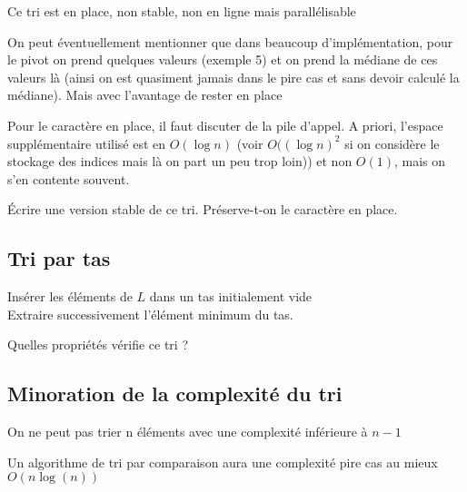 \begin{proposition}
	Ce tri est en place, non stable, non en ligne mais parallélisable
\end{proposition}

\begin{com}
	On peut éventuellement mentionner que dans beaucoup d'implémentation, pour le pivot on prend quelques valeurs (exemple 5) et on prend la médiane de ces valeurs là (ainsi on est quasiment jamais dans le pire cas et sans devoir calculé la médiane). Mais avec l'avantage de rester en place
\end{com}

\begin{com}
	Pour le caractère en place, il faut discuter de la pile d'appel. A priori, l'espace supplémentaire utilisé est en $O(\log n)$ (voir $O((\log n)^2$ si on considère le stockage des indices mais là on part un peu trop loin)) et non $O(1)$, mais on s'en contente souvent.
\end{com}

\begin{exercise}
	Écrire une version stable de ce tri. Préserve-t-on le caractère en place.
\end{exercise}

\subsection{Tri par tas}

\begin{algorithm}[H]
	\caption{$tri\_tas(L)$}
	Insérer les éléments de $L$ dans un tas initialement vide\\
	Extraire successivement l'élément minimum du tas.
\end{algorithm}

\begin{exercise}
	Quelles propriétés vérifie ce tri ?
\end{exercise}

\subsection{Minoration de la complexité du tri}

\begin{proposition}
	On ne peut pas trier n éléments avec une complexité inférieure à $n-1$
\end{proposition}

\begin{proposition}
	Un algorithme de tri par comparaison aura une complexité pire cas au mieux $O(n \log(n))$
\end{proposition}

